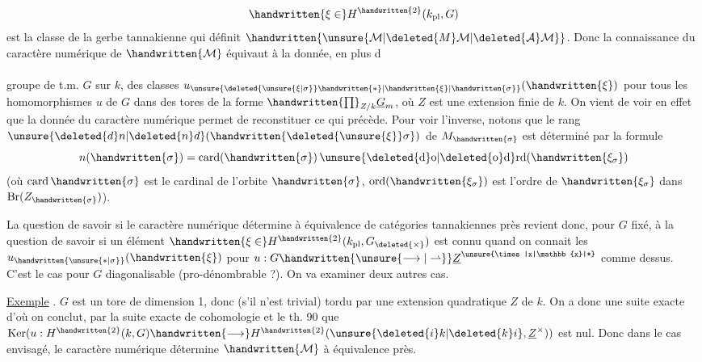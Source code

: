 \[
\handwritten{\xi\in}H^{\handwritten{2}}(k_{\mathrm{pl}},G)
\]
est la classe de la gerbe tannakienne qui définit $\handwritten{\unsure{\mathcal{M}|\deleted{M}\mathcal{M}|\deleted{\mathcal{A}}\mathcal{M}}}$. Donc la connaissance du caractère numérique de $\handwritten{\mathcal{M}}$ équivaut à la donnée, en plus d\\ \hspace*{3cm}\\ groupe de t.m. $G$ sur $k$, des classes $u_{\unsure{\deleted{\unsure{\xi|\sigma}}\handwritten{*}|\handwritten{\xi}|\handwritten{\sigma}}}(\handwritten{\xi})$ pour tous les homomorphismes $u$ de $G$ dans des tores de la forme $\handwritten{\prod}_{Z/k}\underline{G}_m$, où $Z$ est une extension finie de $k$. \deleted{(}On vient de voir en effet que la donnée du caractère numérique permet de reconstituer ce qui précède. Pour voir l'inverse, notons que  le rang $\unsure{\deleted{d}n|\deleted{n}d}(\handwritten{\deleted{\unsure{\xi}}\sigma})$ de $M_{\handwritten{\sigma}}$ est déterminé par la formule
\[
n(\handwritten{\sigma})=\operatorname{card}(\handwritten{\sigma})\operatorname{\unsure{\deleted{d}o|\deleted{o}d}rd}(\handwritten{\xi_\sigma})
\]
(où $\operatorname{card}\handwritten{\sigma}$ est le cardinal de l'orbite $\handwritten{\sigma}$, $\operatorname{ord}(\handwritten{\xi_\sigma})$ est l'ordre de $\handwritten{\xi_\sigma}$ dans $\operatorname{Br}(Z_{\handwritten{\sigma}})$).

La question de savoir si le caractère numérique détermine à équivalence de catégories tannakiennes près revient donc, pour $G$ fixé, à la question de savoir si un élément  $\handwritten{\xi\in}H^{\handwritten{2}}(k_{\mathrm{pl}},G_{\deleted{\times}})$ est connu quand on connait les $u_{\handwritten{\unsure{*|\sigma}}}(\handwritten{\xi})$ pour $u:G\handwritten{\unsure{\longrightarrow|\rightharpoonup}}\underline{Z}^{\unsure{\times|x|\mathbb{x}|*}}$ comme dessus.  C'est le cas pour $G$ diagonalisable  (pro-dénombrable ?). On va examiner deux autres cas.

\uline{Exemple} . $G$ est un tore de dimension 1, donc (s'il n'est trivial) tordu par une extension quadratique $Z$ de $k$. On a donc une suite exacte
d'où on conclut, par la suite exacte de cohomologie et le th. 90 que $\operatorname{Ker}(u:H^{\handwritten{2}}(k,G)\handwritten{\longrightarrow}H^{\handwritten{2}}(\unsure{\deleted{i}k|\deleted{k}i},\underline{Z}^{\times}))$ est nul. Donc dans le cas envisagé, le caractère numérique détermine $\handwritten{\mathcal{M}}$ à équivalence près.

